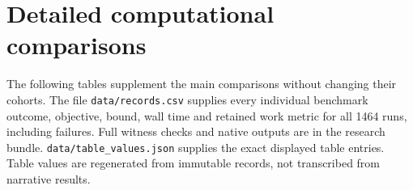 \section{Detailed computational comparisons}\label{app:computational}
The following tables supplement the main comparisons without changing their cohorts. The file \texttt{data/records.csv} supplies every individual benchmark outcome, objective, bound, wall time and retained work metric for all 1464 runs, including failures. Full witness checks and native outputs are in the research bundle. \texttt{data/table\_values.json} supplies the exact displayed table entries. Table values are regenerated from immutable records, not transcribed from narrative results.

\begin{table}[htbp]\centering\small
\caption{Every primary accepted-status discrepancy between ESH and ECP. ESH solves; ECP retains a feasible open gap.}\label{tab:discordant}

\end{table}
\begin{table}[htbp]\centering\small
\caption{Three schedules, unchanged solver seed: accepted counts (out of 33) and full-cohort PAR10 seconds for each repetition.}\label{tab:repeat-outcomes}

\end{table}
\begin{table}[htbp]\centering\small
\caption{Fixed common-solved cohorts across three repetitions: ESH/ECP shifted means in seconds, followed by their ratio.}\label{tab:repetitions}

\end{table}
\begin{table}[htbp]\centering\small
\caption{Held-out ESH/ECP shifted wall-time ratios and common-solved counts in parentheses. Family scheduled counts are six except logsumexp (three); size scheduled counts are 11 each.}\label{tab:family-size}

\end{table}
\begin{table}[htbp]\centering\small
\caption{Formulation and tree contrasts on matched held-out common-solved cohorts. Ratios are of shifted wall-time means, with common counts in parentheses; cohort membership differs by contrast.}\label{tab:structure}

\end{table}
\begin{table}[htbp]\centering\scriptsize
\caption{Paired medians, ESH / ECP, on the same common-solved cohorts as \cref{tab:work}. Node/NLP mean savings do not uniformly persist at the median.}\label{tab:work-medians}

\end{table}

